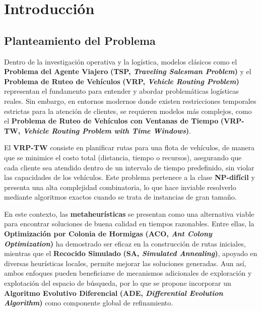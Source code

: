\documentclass[12pt,titlepage,twoside,openright]{book}
\begin{document}
\vspace{0.5cm}

\mainmatter
\pagestyle{fancy}
\fancyhf{}
\fancyhead[RO,LE]{\bfseries \thepage}
\fancyhead[LO]{\nouppercase{\rightmark}}
\fancyhead[RE]{\nouppercase{\leftmark}}
\fancyfoot{}

\setlength{\parindent}{2em}
\setlength{\parskip}{1.5ex}


\newcommand{\tab}{\hspace*{1cm}}

\chapter{Introducción}
\label{cap:introduccion}

\section{Planteamiento del Problema}

Dentro de la investigación operativa y la logística, modelos clásicos como el \textbf{Problema del Agente Viajero} \textbf{(TSP, \emph{Traveling Salesman Problem})} y el \textbf{Problema de Ruteo de Vehículos} \textbf{(VRP, \emph{Vehicle Routing Problem})} representan el fundamento para entender y abordar problemáticas logísticas reales. Sin embargo, en entornos modernos donde existen restricciones temporales estrictas para la atención de clientes, se requieren modelos más complejos, como el \textbf{Problema de Ruteo de Vehículos con Ventanas de Tiempo} \textbf{(VRP-TW, \emph{Vehicle Routing Problem with Time Windows})}.

El \textbf{VRP-TW} consiste en planificar rutas para una flota de vehículos, de manera que se minimice el costo total (distancia, tiempo o recursos), asegurando que cada cliente sea atendido dentro de un intervalo de tiempo predefinido, sin violar las capacidades de los vehículos. Este problema pertenece a la clase \textbf{NP-difícil} y presenta una alta complejidad combinatoria, lo que hace inviable resolverlo mediante algoritmos exactos cuando se trata de instancias de gran tamaño.

En este contexto, las \textbf{metaheurísticas} se presentan como una alternativa viable para encontrar soluciones de buena calidad en tiempos razonables. Entre ellas, la \textbf{Optimización por Colonia de Hormigas} \textbf{(ACO, \emph{Ant Colony Optimization})} ha demostrado ser eficaz en la construcción de rutas iniciales, mientras que el \textbf{Recocido Simulado} \textbf{(SA, \emph{Simulated Annealing})}, apoyado en diversas heurísticas locales, permite mejorar las soluciones generadas. Aun así, ambos enfoques pueden beneficiarse de mecanismos adicionales de exploración y explotación del espacio de búsqueda, por lo que se propone incorporar un \textbf{Algoritmo Evolutivo Diferencial} \textbf{(ADE, \emph{Differential Evolution Algorithm})} como componente global de refinamiento.
\end{document}

